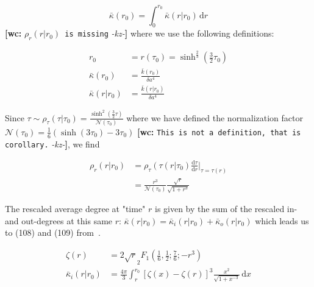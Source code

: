 \documentclass[preprint,notitlepage,amsmath,amssymb,floatfix]{revtex4-1}
\newcommand{\XXX}[3]{{\bf [#1: } {\tt #3} {\it -#2-}{\bf ]}}
\begin{document}
\begin{equation}
\bar\kappa\left(r_0\right) = \int_0^{r_0}\!\bar\kappa\left(r|r_0\right)\,\mathrm dr 
\end{equation}
\XXX{wc}{kz}{$\rho_r(r|r_0)$ is missing}
\noindent where we use the following definitions:

\begin{equation}
\begin{split}
r_0 &= r\left(\tau_0\right) = \sinh^{\frac{2}{3}}\left(\frac{3}{2}\tau_0\right) \\
\bar\kappa\left(r_0\right) &= \frac{\bar k\left(r_0\right)}{\delta a^4} \\
\bar\kappa\left(r|r_0\right) &= \frac{\bar k\left(r|r_0\right)}{\delta a^4}
\end{split}
\end{equation}

\noindent Since $\tau \sim \rho_\tau\left(\tau|\tau_0\right) = \frac{\sinh^2\left(\frac{3}{2}\tau\right)}{\mathcal{N}\left(\tau_0\right)}$ where we have defined the normalization factor $\mathcal{N}\left(\tau_0\right) = \frac{1}{6}\left(\sinh\left(3\tau_0\right) - 3\tau_0\right)$ \XXX{wc}{kz}{This is not a definition, that is corollary.}, we find

\begin{equation}
\begin{split}
\rho_r\left(r|r_0\right) &= \rho_\tau\left(\tau\left(r\right|\tau_0\right)\frac{\mathrm d\tau}{\mathrm dr}|_{\tau=\tau\left(r\right)} \\
 &= \frac{r^3}{\mathcal{N}\left(\tau_0\right)}\frac{\sqrt r}{\sqrt{1+r^3}}
\end{split}
\end{equation}

\noindent The rescaled average degree at "time" $r$ is given by the sum of the rescaled in- and out-degrees at this same $r$:  $\bar\kappa\left(r|r_0\right) = \bar\kappa_i\left(r|r_0\right) + \bar\kappa_o\left(r|r_0\right)$ which leads us to (108) and (109) from~\cite{ref:snc2012}.

\begin{equation}
\begin{split}
\zeta\left(r\right) &= 2\sqrt r _2F_1\left(\frac{1}{6},\frac{1}{2};\frac{7}{6}; -r^3\right) \\
\bar\kappa_i\left(r|r_0\right) &= \frac{4\pi}{3}\int_r^{r_0}\!\left[\zeta\left(x\right)-\zeta\left(r\right)\right]^3\frac{x^2}{\sqrt{1+x^{-3}}}\,\mathrm dx
\end{split}
\end{equation}
\end{document}
